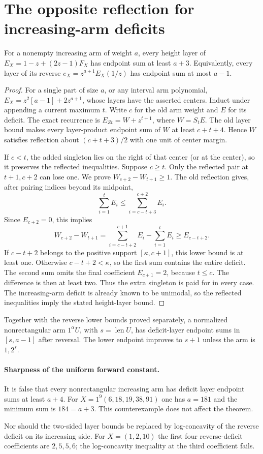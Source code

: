 \section{The opposite reflection for increasing-arm deficits}
\begin{theorem}
For a nonempty increasing arm of weight $a$, every height layer
of $E_X=1-z+(2z-1)F_X$ has endpoint sum at least $a+3$.
Equivalently, every layer of its reverse $e_X=z^{a+1}E_X(1/z)$
has endpoint sum at most $a-1$.
\end{theorem}
\begin{proof}
For a single part of size $a$, or any interval arm polynomial,
$E_X=z^2[a-1]+2z^{a+1}$, whose layers have the asserted centers.
Induct under appending a current maximum $t$. Write $c$ for
the old arm weight and $E$ for its deficit. The exact recurrence
is $E_{Zt}=W+z^{t+1}$, where $W=S_tE$.
The old layer bound makes every layer-product endpoint sum of
$W$ at least $c+t+4$. Hence $W$ satisfies reflection about
$(c+t+3)/2$ with one unit of center margin.

If $c<t$, the added singleton lies on the right of that center
(or at the center), so it preserves the reflected inequalities.
Suppose $c\ge t$. Only the reflected pair at $t+1,c+2$ can
lose one. We prove $W_{c+2}-W_{t+1}\ge1$.
The old reflection gives, after pairing indices beyond its midpoint,
\[
 \sum_{i=1}^{t}E_i\le\sum_{i=c-t+3}^{c+2}E_i.
\]
Since $E_{c+2}=0$, this implies
\[
 W_{c+2}-W_{t+1}
 =\sum_{i=c-t+2}^{c+1}E_i-\sum_{i=1}^{t}E_i
 \ge E_{c-t+2}.
\]
If $c-t+2$ belongs to the positive support $[\kappa,c+1]$,
this lower bound is at least one. Otherwise $c-t+2<\kappa$,
so the first sum contains the entire deficit. The second sum
omits the final coefficient $E_{c+1}=2$, because $t\le c$.
The difference is then at least two.
Thus the extra singleton is paid for in every case.
The increasing-arm deficit is already known to be unimodal,
so the reflected inequalities imply the stated height-layer bound.
\end{proof}

Together with the reverse lower bounds proved separately, a
normalized nonrectangular arm $1^\alpha U$, with
$s=\operatorname{len}U$, has deficit-layer endpoint sums in
$[s,a-1]$ after reversal. The lower endpoint improves to $s+1$
unless the arm is $1,2^s$.

\paragraph{Sharpness of the uniform forward constant.}
It is false that every nonrectangular increasing arm has deficit
layer endpoint sums at least $a+4$. For
$X=1^9(6,18,19,38,91)$ one has $a=181$ and the minimum sum is
$184=a+3$. This counterexample does not affect the theorem.

Nor should the two-sided layer bounds be replaced by log-concavity
of the reverse deficit on its increasing side. For $X=(1,2,10)$
the first four reverse-deficit coefficients are $2,5,5,6$;
the log-concavity inequality at the third coefficient fails.
